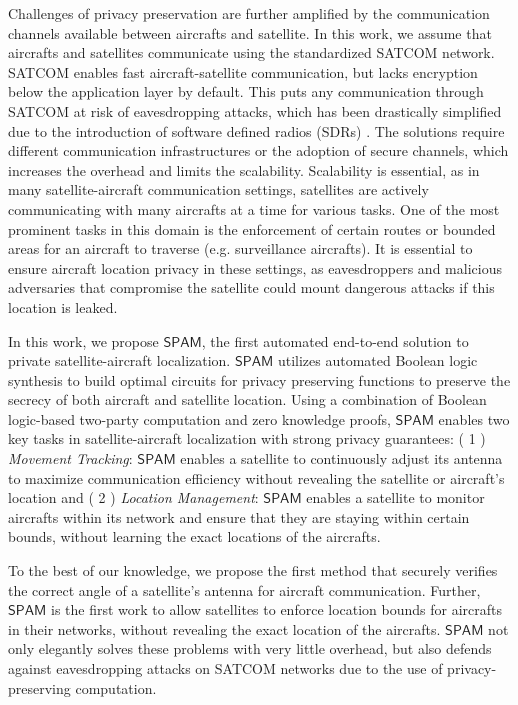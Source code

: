 \documentclass[9pt,sigconf,screen]{acmart}
\newcommand{\nasimeh}[1]{\textcolor{purple}{{\sf (NH:} {\sl{#1})}}}
\newcommand\sys{$\mathsf{SPAM}$\xspace}
\begin{document}
Challenges of privacy preservation are further amplified by the communication channels available between aircrafts and satellite. In this work, we assume that aircrafts and satellites communicate using the standardized SATCOM network. SATCOM enables fast aircraft-satellite communication, but lacks encryption below the application layer by default. This puts any communication through SATCOM at risk of eavesdropping attacks, which has been drastically simplified due to the introduction of software defined radios (SDRs) \cite{9811060}. The solutions require different communication infrastructures or the adoption of secure channels, which increases the overhead and limits the scalability. Scalability is essential, as in many satellite-aircraft communication settings, satellites are actively communicating with many aircrafts at a time for various tasks. One of the most prominent tasks in this domain is the enforcement of certain routes or bounded areas for an aircraft to traverse (e.g. surveillance aircrafts). It is essential to ensure aircraft location privacy in these settings, as eavesdroppers and malicious adversaries that compromise the satellite could mount dangerous attacks if this location is leaked.

In this work, we propose \sys, the first automated end-to-end solution to private satellite-aircraft localization. \sys utilizes automated Boolean logic synthesis to build optimal circuits for privacy preserving functions to preserve the secrecy of both aircraft and satellite location. Using a combination of Boolean logic-based two-party computation and zero knowledge proofs, \sys enables two key tasks in satellite-aircraft localization with strong privacy guarantees: 
( 1 ) \textit{Movement Tracking}: \sys enables a satellite to continuously adjust its antenna to maximize communication efficiency without revealing the satellite or aircraft's location and ( 2 ) \textit{Location Management}: \sys enables a satellite to monitor aircrafts within its network and ensure that they are staying within certain bounds, without learning the exact locations of the aircrafts.

To the best of our knowledge, we propose the first method that securely verifies the correct angle of a satellite's antenna for aircraft communication. Further, \sys is the first work to allow satellites to enforce location bounds for aircrafts in their networks, without revealing the exact location of the aircrafts. \sys not only elegantly solves these problems with very little overhead, but also defends against eavesdropping attacks on SATCOM networks due to the use of privacy-preserving computation.
\end{document}
